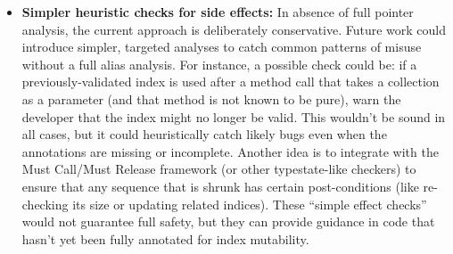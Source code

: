 \begin{itemize}
\item
  \textbf{Simpler heuristic checks for side effects:}
    In absence of full pointer analysis, the current approach is deliberately conservative. Future work
    could introduce simpler, targeted analyses to catch common patterns of misuse without a full alias
    analysis. For instance, a possible check could be: if a previously-validated index is used after a
    method call that takes a collection as a parameter (and that method is not known to be pure), warn
    the developer that the index might no longer be valid. This wouldn’t be sound in all cases, but it
    could heuristically catch likely bugs even when the annotations are missing or incomplete. Another
    idea is to integrate with the Must Call/Must Release framework (or other typestate-like checkers) to
    ensure that any sequence that is shrunk has certain post-conditions (like re-checking its size or updating
    related indices). These “simple effect checks” would not guarantee full safety, but they can provide
    guidance in code that hasn’t yet been fully annotated for index mutability.
\end{itemize}

